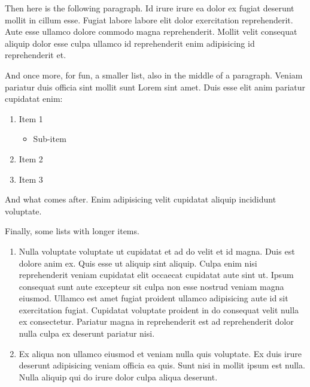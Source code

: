 \documentclass[
    12pt,
    letterpaper,
    oneside,
    noraggedright
]{turabian-researchpaper}
\makeatletter
\providecommand{\tightlist}{%
    \ifthenelse{\equal{\the\@listdepth}{1}}
    {}
    {\vspace{-\baselineskip}}
}
\makeatother
\begin{document}
Then here is the following paragraph. Id irure irure ea dolor ex fugiat
deserunt mollit in cillum esse. Fugiat labore labore elit dolor
exercitation reprehenderit. Aute esse ullamco dolore commodo magna
reprehenderit. Mollit velit consequat aliquip dolor esse culpa ullamco
id reprehenderit enim adipisicing id reprehenderit et.

And once more, for fun, a smaller list, also in the middle of a
paragraph. Veniam pariatur duis officia sint mollit sunt Lorem sint
amet. Duis esse elit anim pariatur cupidatat enim:

\begin{enumerate}
\def\labelenumi{\arabic{enumi}.}
\tightlist
\item
  Item 1

  \begin{itemize}
  \tightlist
  \item
    Sub-item
  \end{itemize}
\item
  Item 2
\item
  Item 3
\end{enumerate}

\noindent{}And what comes after. Enim adipisicing velit cupidatat
aliquip incididunt voluptate.

Finally, some lists with longer items.

\begin{enumerate}
\def\labelenumi{\arabic{enumi}.}
\tightlist
\item
  Nulla voluptate voluptate ut cupidatat et ad do velit et id magna.
  Duis est dolore anim ex. Quis esse ut aliquip sint aliquip. Culpa enim
  nisi reprehenderit veniam cupidatat elit occaecat cupidatat aute sint
  ut. Ipsum consequat sunt aute excepteur sit culpa non esse nostrud
  veniam magna eiusmod. Ullamco est amet fugiat proident ullamco
  adipisicing aute id sit exercitation fugiat. Cupidatat voluptate
  proident in do consequat velit nulla ex consectetur. Pariatur magna in
  reprehenderit est ad reprehenderit dolor nulla culpa ex deserunt
  pariatur nisi.
\item
  Ex aliqua non ullamco eiusmod et veniam nulla quis voluptate. Ex duis
  irure deserunt adipisicing veniam officia ea quis. Sunt nisi in mollit
  ipsum est nulla. Nulla aliquip qui do irure dolor culpa aliqua
  deserunt.
\end{enumerate}
\end{document}
